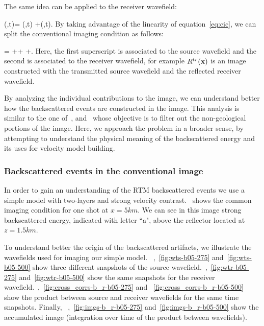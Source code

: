 The same idea can be applied to the receiver wavefield:

\beq
\UR(\xx,t)= \URr(\xx,t) +\URt(\xx,t).
\label{eq:rsplit}
\eeq
%
By taking advantage of the linearity of equation~\ref{eq:cic},  we
can split the conventional imaging condition as follows:

\beq
\R= ++  +.
\label{eq:cicsplit}
\eeq
%
Here, the first superscript is associated to the source wavefield and the second is associated to the
receiver wavefield, for example $R^{tr}({\bf x})$ is an image constructed with the transmitted source wavefield
and the reflected receiver wavefield.

By analyzing the individual contributions to the image, we can understand better how the backscattered events
are constructed in the image. This analysis is similar to the one of~\cite{fei:3130}, and~\cite{liu:S29}
whose objective is to filter out the non-geological portions of the image. Here, we approach the problem 
in a broader sense, by attempting to understand the physical meaning of the backscattered energy and its
uses for velocity model building.


\subsubsection{Backscattered events in the conventional image}

In order to gain an understanding of the RTM backscattered events we use a simple model with two-layers and strong velocity
contrast.~ shows the common imaging condition for one shot at $x=5km$. We can see in this image strong 
backscattered energy, indicated with letter ``a", above the reflector located at $z=1.5km$.

To understand better the origin of the backscattered artifacts, we illustrate the wavefields used for imaging our simple model.
~,~\ref{fig:wts-b05-275} and~\ref{fig:wts-b05-500} show three different snapshots
of the source wavefield.~,~\ref{fig:wtr-b05-275} and~\ref{fig:wtr-b05-500}
show the same snapshots for the receiver wavefield.~,~\ref{fig:cross_corrs-b_r-b05-275} and
~\ref{fig:cross_corrs-b_r-b05-500} show the product between source and receiver wavefields for the same time snapshots. Finally,
~,~\ref{fig:imgs-b_r-b05-275} and~\ref{fig:imgs-b_r-b05-500} show the accumulated image (integration over time of 
the product between wavefields).

